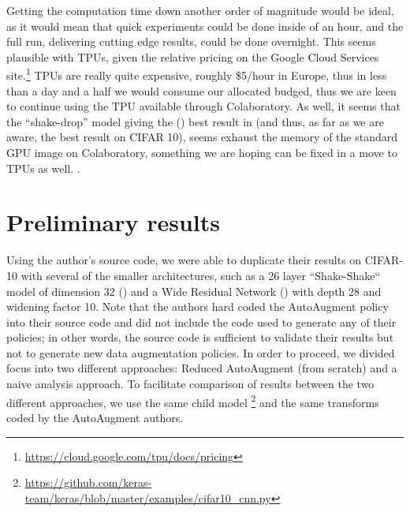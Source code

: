 \documentclass[10pt,twocolumn,letterpaper]{article}
\begin{document}
		Getting the computation time down another order of magnitude would be ideal, as it would mean that quick experiments could be done inside of an hour, and the full run, delivering cutting edge results, could be done overnight. This seems plausible with TPUs, given the relative pricing on the Google Cloud Services site.\footnote{\url{https://cloud.google.com/tpu/docs/pricing}} TPUs are really quite expensive, roughly \$5/hour in Europe, thus in less than a day and a half we would consume our allocated budged, thus we are keen to continue using the TPU available through Colaboratory. As well, it seems that the ``shake-drop'' model giving the (\cite{Yamada2018}) best result in \cite{Cubuk2018} (and thus, as far as we are aware, the best result on CIFAR 10), seems exhaust the memory of the standard GPU image on Colaboratory, something we are hoping can be fixed in a move to TPUs as well. . 

\section{Preliminary results}

	

	Using the author's source code, we were able to duplicate their results on CIFAR-10 with several of the smaller architectures, such as a 26 layer ``Shake-Shake`` model of dimension 32 (\cite{Gastaldi2017}) and a Wide Residual Network (\cite{Zagoruyko2016}) with depth 28 and widening factor 10. Note that the authors hard coded the AutoAugment policy into their source code and did not include the code used to generate any of their policies; in other words, the source code is sufficient to validate their results but not to generate new data augmentation policies. In order to proceed, we divided focus into two different approaches: Reduced AutoAugment (from scratch) and a naive analysis approach. To facilitate comparison of results between the two different approaches, we use the same child model \footnote{\url{https://github.com/keras-team/keras/blob/master/examples/cifar10_cnn.py}} and the same transforms coded by the AutoAugment authors.
	
\end{document}
